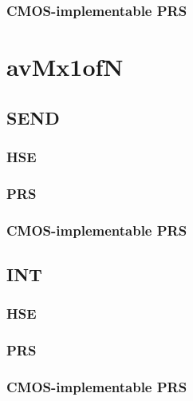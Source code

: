 \documentclass{article}
\begin{document}
\subsubsection{CMOS-implementable PRS}

\section{avMx1ofN}

\subsection{SEND}

\subsubsection{HSE}

\subsubsection{PRS}

\subsubsection{CMOS-implementable PRS}

\subsection{INT}

\subsubsection{HSE}

\subsubsection{PRS}

\subsubsection{CMOS-implementable PRS}
\end{document}
